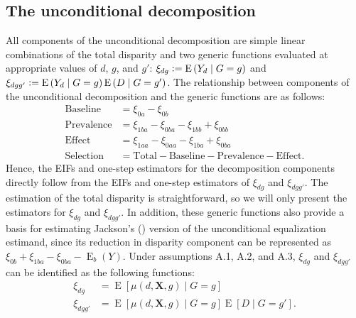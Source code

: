 \documentclass[12pt,a4paper]{article}
\newcommand{\E}{\operatorname{E}}
\def\X{{\boldsymbol X}}
\newcommand{\defeq}{\vcentcolon=}
\begin{document}
\subsection{The unconditional decomposition}
All components of the unconditional decomposition are simple linear combinations of the total disparity and two generic functions evaluated at appropriate values of $d$, $g$, and $g'$: $\xi_{dg} \defeq \E \left(Y_d \mid G=g  \right)$ and $\xi_{dgg'} \defeq \E \left(Y_d \mid G=g \right)\E \left(D \mid G=g' \right)$. The relationship between components of the unconditional decomposition and the generic functions are as follows:
\begin{align*}
    \text{Baseline} &= \xi_{0a}-\xi_{0b}  \\
    \text{Prevalence} &= \xi_{1ba}-\xi_{0ba}-\xi_{1bb}+\xi_{0bb} \\
    \text{Effect} &= \xi_{1aa}-\xi_{0aa} - \xi_{1ba}+\xi_{0ba} \\
    \text{Selection} &= \text{Total} - \text{Baseline} - \text{Prevalence} - \text{Effect} .
\end{align*}
Hence, the EIFs and one-step estimators for the decomposition components directly follow from the EIFs and one-step estimators of $\xi_{dg}$ and $\xi_{dgg'}$. The estimation of the total disparity is straightforward, so we will only present the estimators for $\xi_{dg}$ and $\xi_{dgg'}$. In addition, these generic functions also provide a basis for estimating Jackson's (\citeyear{jackson_decomposition_2018}) version of the unconditional equalization estimand, since its reduction in disparity component can be represented as $\xi_{0b} + \xi_{1ba}-\xi_{0ba}-\E_b(Y)$. Under assumptions A.1, A.2, and A.3, $\xi_{dg}$ and $\xi_{dgg'}$ can be identified as the following functions:
\begin{align*}
    \xi_{dg} &= \E \left[\mu(d,\X,g) \mid G=g \right] \\
    \xi_{dgg'} &= \E \left[\mu(d,\X,g) \mid G=g \right] \E \left[D \mid G=g' \right].
\end{align*}
\end{document}
